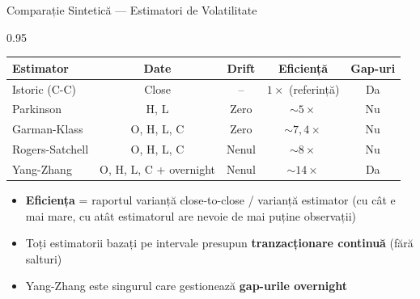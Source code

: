 \documentclass[9pt, aspectratio=169, t]{beamer}
\begin{document}
\begin{frame}[shrink=10]{Comparație Sintetică --- Estimatori de Volatilitate}
    \begin{cminipage}{0.95\textwidth}
    \begin{center}
    {\small
    \begin{tabular}{l c c c c}
    \toprule
    \textbf{Estimator} & \textbf{Date} & \textbf{Drift} & \textbf{Eficiență} & \textbf{Gap-uri} \\
    \midrule
    Istoric (C-C) & Close & -- & $1\times$ (referință) & Da \\
    Parkinson & H, L & Zero & $\sim 5\times$ & Nu \\
    Garman-Klass & O, H, L, C & Zero & $\sim 7{,}4\times$ & Nu \\
    Rogers-Satchell & O, H, L, C & Nenul & $\sim 8\times$ & Nu \\
    Yang-Zhang & O, H, L, C + overnight & Nenul & $\sim 14\times$ & Da \\
    \bottomrule
    \end{tabular}
    }
    \end{center}

    \vspace{0.2cm}

    \begin{itemize}\setlength{\itemsep}{0pt}
        \item \textbf{Eficiența} = raportul varianță close-to-close / varianță estimator (cu cât e mai mare, cu atât estimatorul are nevoie de mai puține observații)
        \item Toți estimatorii bazați pe intervale presupun \textbf{tranzacționare continuă} (fără salturi)
        \item Yang-Zhang este singurul care gestionează \textbf{gap-urile overnight}
    \end{itemize}
    \end{cminipage}
\end{frame}
\end{document}
